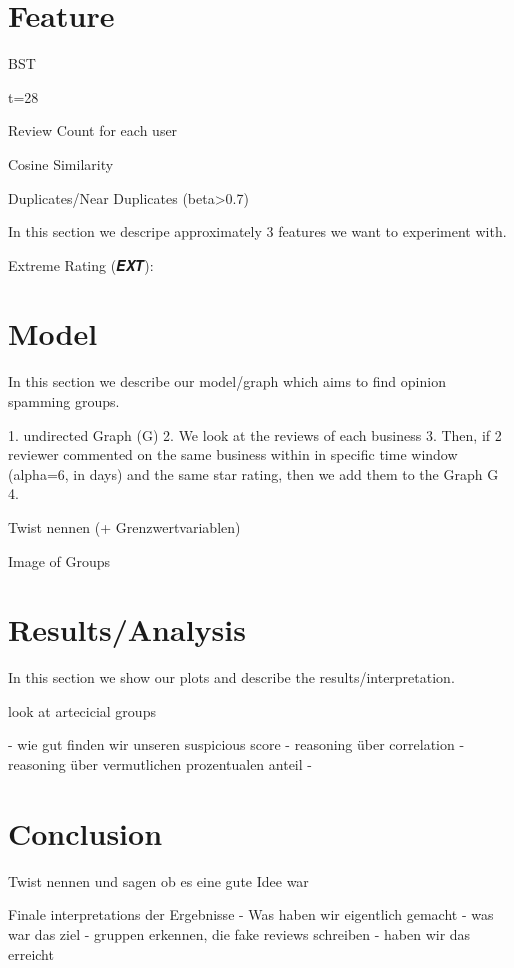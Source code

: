 \documentclass[conference]{IEEEtran}  %
\theoremstyle{plain}
\theoremstyle{definition}
\theoremstyle{remark}
\begin{document}
\section{Feature}
\label{sec:feature}

BST

t=28

Review Count for each user

Cosine Similarity

Duplicates/Near Duplicates (beta>0.7)

In this section we descripe approximately 3 features we want to experiment with.  


Extreme Rating (𝑬𝑿𝑻):


 
\section{Model}
\label{sec:model}

In this section we describe our model/graph which aims to find opinion spamming groups.

1. undirected Graph (G)
2. We look at the reviews of each business
3. Then, if 2 reviewer commented on the same business within in specific time window (alpha=6, in days) and the same star rating, then we add them to the Graph G 
4. 

Twist nennen (+ Grenzwertvariablen) 

Image of Groups


\section{Results/Analysis}
\label{sec:analysis}

In this section we show our plots and describe the results/interpretation. 

look at artecicial groups

- wie gut finden wir unseren suspicious score
- reasoning über correlation
- reasoning über vermutlichen prozentualen anteil
  - 




\section{Conclusion}
\label{sec:concl}


Twist nennen und sagen ob es eine gute Idee war

Finale interpretations der Ergebnisse 
 - Was haben wir eigentlich gemacht
 - was war das ziel
     - gruppen erkennen, die fake reviews schreiben
 - haben wir das erreicht
\end{document}
